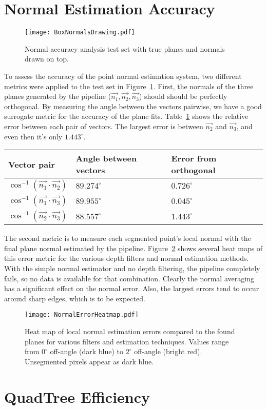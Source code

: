 \section{Normal Estimation Accuracy}
\begin{figure}[!htpb]
    \centering
    \texttt{[image: BoxNormalsDrawing.pdf]}
    \caption{Normal accuracy analysis test set with true planes and normals drawn on top.}
    \label{fig:boxnormalsdrawing}
\end{figure}
To assess the accuracy of the point normal estimation system, two different metrics were applied to the test set in Figure~\ref{fig:boxnormalsdrawing}. First, the normals of the three planes generated by the pipeline ($\vec{n_1},\vec{n_2},\vec{n_3}$) should should be perfectly orthogonal. By measuring the angle between the vectors pairwise, we have a good surrogate metric for the accuracy of the plane fits. Table~\ref{table:orthonormalerror} shows the relative error between each pair of vectors. The largest error is between  $\vec{n_2}$  and $\vec{n_3}$, and even then it's only $1.443^{\circ}$.
\begin{table}[h]
\label{table:orthonormalerror}
\begin{tabular}{|l|l|l|}
\hline
Vector pair                             & Angle between vectors            & Error from orthogonal           \\ \hline
$\cos^{-1}(\vec{n_1} \cdot  \vec{n_2})$ & $89.274^{\circ}$ & $0.726^{\circ}$ \\ \hline
$\cos^{-1}(\vec{n_1} \cdot  \vec{n_3})$ & $89.955^{\circ}$ & $0.045^{\circ}$ \\ \hline
$\cos^{-1}(\vec{n_2} \cdot  \vec{n_3})$ & $88.557^{\circ}$ & $1.443^{\circ}$ \\ \hline
\end{tabular}
\end{table}

The second metric is to measure each segmented point's local normal with the final plane normal estimated by the pipeline. Figure~\ref{fig:normalheatmap} shows several heat maps of this error metric for the various depth filters and normal estimation methods. With the simple normal estimator and no depth filtering, the pipeline completely fails, so no data is available for that combination. Clearly the normal averaging has a significant effect on the normal error. Also, the largest errors tend to occur around sharp edges, which is to be expected.

\begin{figure}[!htpb]
    \centering
    \texttt{[image: NormalErrorHeatmap.pdf]}
    \caption{Heat map of local normal estimation errors compared to the found planes for various filters and estimation techniques. Values range from $0^{\circ}$ off-angle (dark blue) to $2^{\circ}$ off-angle (bright red). Unsegmented pixels appear as dark blue.}
    \label{fig:normalheatmap}
\end{figure}

\section{QuadTree Efficiency}
